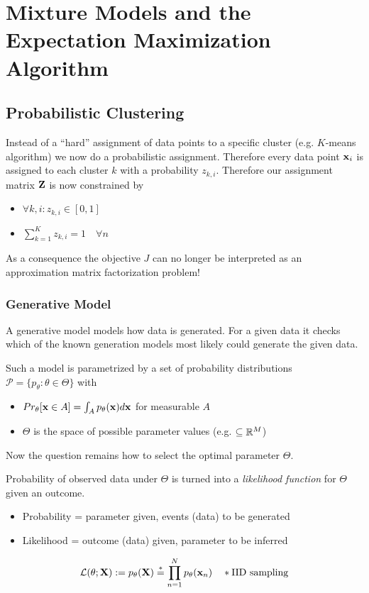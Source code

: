 \chapter{Mixture Models and the Expectation Maximization Algorithm}

\section{Probabilistic Clustering}
Instead of a ``hard'' assignment of data points to a specific cluster (e.g. \(K\)-means algorithm) we now do a probabilistic assignment. Therefore every data point \(\boldsymbol{\mathrm{x}}_i\) is assigned to each cluster \(k\) with a probability \(z_{k, i}\). Therefore our assignment matrix \(\boldsymbol{\mathrm{Z}}\) is now constrained by
\begin{itemize}
\item \(\forall k, i: z_{k, i} \in [0, 1]\)
\item \(\sum_{k=1}^K z_{k, i} = 1 \quad \forall n\)
\end{itemize}

As a consequence the objective \(J\) can no longer be interpreted as an approximation matrix factorization problem!

\subsection{Generative Model}
A generative model models how data is generated. For a given data it checks which of the known generation models most likely could generate the given data.

Such a model is parametrized by a set of probability distributions \(\mathcal{P} = \{p_\theta : \theta \in \Theta\}\) with
\begin{itemize}
\item \(Pr_\theta[\boldsymbol{\mathrm{x}} \in A] = \int_A p_\theta(\boldsymbol{\mathrm{x}}) d\boldsymbol{\mathrm{x}}\) for measurable \(A\)
\item \(\Theta\) is the space of possible parameter values (e.g. \(\subseteq \mathbb{R}^M\))
\end{itemize}

Now the question remains how to select the optimal parameter \(\Theta\).

\begin{definition}
Probability of observed data under \(\Theta\) is turned into a \textit{likelihood function} for \(\Theta\) given an outcome.

\begin{itemize}
\item Probability = parameter given, events (data) to be generated
\item Likelihood = outcome (data) given, parameter to be inferred
\end{itemize}

\[
\mathcal{L}(\theta;\boldsymbol{\mathrm{X}}) := p_\theta(\boldsymbol{\mathrm{X}}) \overset{\ast}{=} \prod_{n=1}^N p_\theta (\boldsymbol{\mathrm{x}}_n) \quad \ast \text{IID sampling}
\]
\end{definition}

